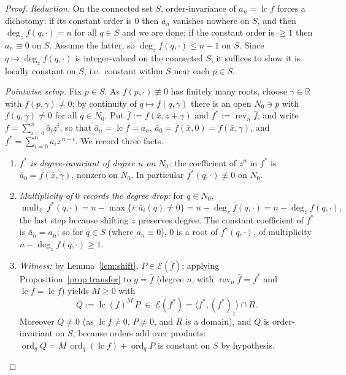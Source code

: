 \documentclass[11pt,a4paper]{article}
\theoremstyle{definition}
\newcommand{\R}{\mathbb{R}}
\newcommand{\xb}{\bar{x}}
\newcommand{\lc}{\operatorname{lc}}
\newcommand{\rev}{\operatorname{rev}}
\newcommand{\ord}{\operatorname{ord}}
\newcommand{\mult}{\operatorname{mult}}
\newcommand{\E}{\mathcal{E}}
\newcommand{\ideal}[1]{\langle #1\rangle}
\begin{document}
\begin{proof}
\emph{Reduction.} On the connected set $S$, order-invariance of $a_n = \lc f$
forces a dichotomy: if its constant order is $0$ then $a_n$ vanishes nowhere on
$S$, and then $\deg_z f(q,\cdot) = n$ for all $q\in S$ and we are done; if the
constant order is $\geq 1$ then $a_n \equiv 0$ on $S$. Assume the latter, so
$\deg_z f(q,\cdot) \leq n - 1$ on $S$. Since $q \mapsto \deg_z f(q,\cdot)$ is
integer-valued on the connected $S$, it suffices to show it is locally constant
on $S$, i.e.\ constant within $S$ near each $p \in S$.

\emph{Pointwise setup.} Fix $p \in S$. As $f(p,\cdot) \not\equiv 0$ has
finitely many roots, choose $\gamma \in \R$ with $f(p,\gamma) \neq 0$; by
continuity of $q \mapsto f(q,\gamma)$ there is an open $N_0 \ni p$ with
$f(q,\gamma) \neq 0$ for all $q \in N_0$. Put $\bar f := f(\xb, z+\gamma)$ and
$f^* := \rev_n \bar f$, and write $\bar f = \sum_{i=0}^n \bar a_i z^i$, so that
$\bar a_n = \lc \bar f = a_n$, $\bar a_0 = \bar f(\xb,0) = f(\xb,\gamma)$, and
$f^* = \sum_{i=0}^n \bar a_i z^{\,n-i}$. We record three facts.

\begin{enumerate}[label=(\arabic*)]
\item \emph{$f^*$ is degree-invariant of degree $n$ on $N_0$:} the coefficient
  of $z^n$ in $f^*$ is $\bar a_0 = f(\xb,\gamma)$, nonzero on $N_0$. In
  particular $f^*(q,\cdot) \not\equiv 0$ on $N_0$.
\item \emph{Multiplicity of $0$ records the degree drop:} for $q \in N_0$,
  \[
    \mult_0\, f^*(q,\cdot)
      = n - \max\{ i : \bar a_i(q) \neq 0\}
      = n - \deg_z \bar f(q,\cdot)
      = n - \deg_z f(q,\cdot),
  \]
  the last step because shifting $z$ preserves degree. The constant
  coefficient of $f^*$ is $\bar a_n = a_n$; so for $q \in S$ (where
  $a_n \equiv 0$), $0$ is a root of $f^*(q,\cdot)$, of multiplicity
  $n - \deg_z f(q,\cdot) \geq 1$.
\item \emph{Witness:} by Lemma~\ref{lem:shift}, $P \in \E(\bar f)$; applying
  Proposition~\ref{prop:transfer} to $g = \bar f$ (degree $n$, with
  $\rev_n \bar f = f^*$ and $\lc \bar f = \lc f$) yields $M \geq 0$ with
  \[
    Q := \lc(f)^M\, P \;\in\; \E(f^*) = \ideal{f^*, (f^*)_z}\cap R .
  \]
  Moreover $Q \neq 0$ (as $\lc f \neq 0$, $P \neq 0$, and $R$ is a domain), and
  $Q$ is order-invariant on $S$, because orders add over products:
  $\ord_q Q = M\,\ord_q(\lc f) + \ord_q P$ is constant on $S$ by hypothesis.
\end{enumerate}


\end{proof}
\end{document}
